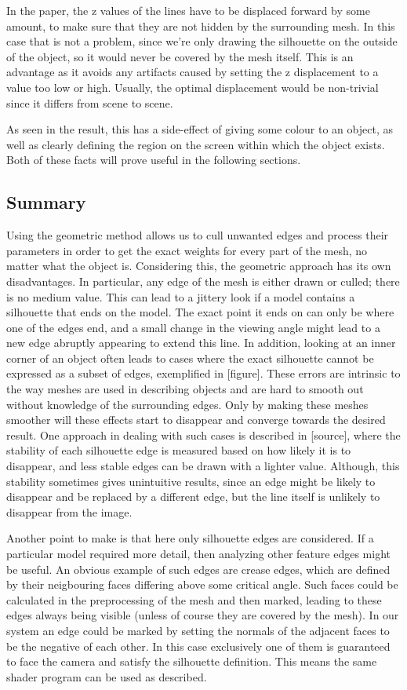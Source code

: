 \documentclass[a4paper, 12pt]{article}
\begin{document}
In the paper, the z values of the lines have to be displaced forward by some amount, to make sure that they are not hidden by the surrounding mesh. In this case that is not a problem, since we're only drawing the silhouette on the outside of the object, so it would never be covered by the mesh itself. This is an advantage as it avoids any artifacts caused by setting the z displacement to a value too low or high. Usually, the optimal displacement would be non-trivial since it differs from scene to scene.

As seen in the result, this has a side-effect of giving some colour to an object, as well as clearly defining the region on the screen within which the object exists. Both of these facts will prove useful in the following sections.


\subsection{Summary}
Using the geometric method allows us to cull unwanted edges and process their parameters in order to get the exact weights for every part of the mesh, no matter what the object is. Considering this, the geometric approach has its own disadvantages. In particular, any edge of the mesh is either drawn or culled; there is no medium value. This can lead to a jittery look if a model contains a silhouette that ends on the model. The exact point it ends on can only be where one of the edges end, and a small change in the viewing angle might lead to a new edge abruptly appearing to extend this line. In addition, looking at an inner corner of an object often leads to cases where the exact silhouette cannot be expressed as a subset of edges, exemplified in [figure]. These errors are intrinsic to the way meshes are used in describing objects and are hard to smooth out without knowledge of the surrounding edges. Only by making these meshes smoother will these effects start to disappear and converge towards the desired result. One approach in dealing with such cases is described in [source], where the stability of each silhouette edge is measured based on how likely it is to disappear, and less stable edges can be drawn with a lighter value. Although, this stability sometimes gives unintuitive results, since an edge might be likely to disappear and be replaced by a different edge, but the line itself is unlikely to disappear from the image.

Another point to make is that here only silhouette edges are considered. If a particular model required more detail, then analyzing other feature edges might be useful. An obvious example of such edges are crease edges, which are defined by their neigbouring faces differing above some critical angle. Such faces could be calculated in the preprocessing of the mesh and then marked, leading to these edges always being visible (unless of course they are covered by the mesh). In our system an edge could be marked by setting the normals of the adjacent faces to be the negative of each other. In this case exclusively one of them is guaranteed to face the camera and satisfy the silhouette definition. This means the same shader program can be used as described.
\end{document}

